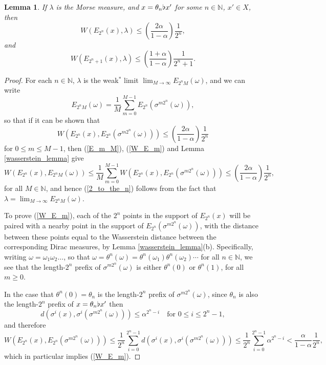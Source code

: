\documentclass[10pt,a4paper]{amsart}
\newtheorem{lem}{Lemma}
\def \N {\mathbb N}
\def\a{\alpha}
\def\b{\kern 0.02em \flat \kern 0.02em}
\begin{document}
\begin{lem}
If $\lambda$ is the Morse measure, and $x=\theta_n \b x'$ for some $n\in\N$, $x'\in X$, 
then
\begin{equation}\label{2_to_the_n}
W(E_{2^{n}}(x),\lambda)\le \left(\frac{2\a}{1-\a}\right) \frac{1}{2^{n}},
\end{equation}
and
\begin{equation}\label{2_to_the_n_plus_one}
W(E_{2^{n}+1}(x),\lambda)\le \left(\frac{1+\a}{1-\a}\right) \frac{1}{2^{n}+1}.
\end{equation}
\end{lem}

\begin{proof}
For each $n\in\N$, 
$\lambda$ is the weak$^*$ limit
$\lim_{M\to\infty} E_{2^nM}(\omega)$, and we can write
\begin{equation}\label{E_m_M}
E_{2^nM}(\omega)
=
\frac{1}{M}\sum_{m=0}^{M-1} E_{2^n}\left(\sigma^{m2^n}(\omega)\right),
\end{equation}
so that if it can be shown that
\begin{equation}\label{W_E_m}
W\left(E_{2^n}(x),  E_{2^n}\left(\sigma^{m2^n}(\omega)\right) \right) \le \left(\frac{2\a}{1-\a}\right) \frac{1}{2^{n}}
\end{equation}
for $0\le m\le M-1$, then (\ref{E_m_M}), (\ref{W_E_m}) and Lemma \ref{wasserstein_lemma} give
$$
W\left(E_{2^{n}}(x),  E_{2^nM}(\omega)\right)\le
\frac{1}{M} \sum_{m=0}^{M-1} W( E_{2^{n}}(x),  E_{2^n}\left(\sigma^{m2^n}(\omega)\right) )
\le \left(\frac{2\a}{1-\a}\right) \frac{1}{2^{n}},
$$
for all $M\in\N$, and hence (\ref{2_to_the_n}) follows from the fact that $\lambda=\lim_{M\to\infty} E_{2^nM}(\omega)$.

To prove (\ref{W_E_m}), each of the $2^n$ points in the support of $E_{2^n}(x)$ 
will be paired with a nearby point in the support of
$E_{2^n}(\sigma^{m2^n}(\omega))$, with the distance between these points 
equal to the Wasserstein distance between the corresponding Dirac measures, by Lemma \ref{wasserstein_lemma}(b).
Specifically, writing $\omega=\omega_1\omega_2\ldots$, so that
	$\omega=\theta^n(\omega)=\theta^n(\omega_1)\theta^n(\omega_2)\cdots$
for all $n\in\N$,
we see that 
 the length-$2^n$ prefix of
$\sigma^{m2^n}(\omega)$
is either $\theta^n(0)$ or $\theta^n(1)$,
for all $m\ge0$.

In the case that $\theta^n(0)=\theta_n$
is the length-$2^n$ prefix of
$\sigma^{m2^n}(\omega)$, since $\theta_n$ is also the length-$2^n$ prefix of $x=\theta_n \b x'$
then 
\begin{equation*}
d(\sigma^i(x),\sigma^i(\sigma^{m2^n}(\omega)))\le \alpha^{2^n-i} \quad\text{for }0\le i\le 2^n-1,
\end{equation*}
and therefore
$$
W\left(E_{2^n}(x),  E_{2^n}\left(\sigma^{m2^n}(\omega)\right) \right) \le
\frac{1}{2^n} \sum_{i=0}^{2^n-1} d(\sigma^i(x),\sigma^i(\sigma^{m2^n}(\omega)))
\le
\frac{1}{2^n} \sum_{i=0}^{2^n-1} \alpha^{2^n-i} < \frac{\alpha}{1-\alpha} \frac{1}{2^n},
$$
which in particular implies (\ref{W_E_m}).


\end{proof}
\end{document}
